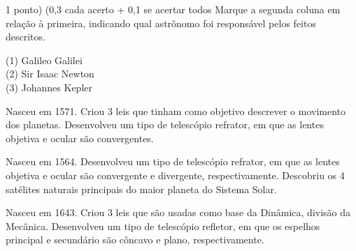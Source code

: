 \documentclass{../lista}
\begin{document}
	\begin{questao}{1 ponto) (0,3 cada acerto + 0,1 se acertar todos}
		Marque a segunda coluna em relação à primeira, indicando qual astrônomo foi responsável pelos feitos descritos.
		\begin{multicols}{2}
			\vfill\null \vfill\null
			\begin{flushleft}
				(1) Galileo Galilei \\
				(2) Sir Isaac Newton \\
				(3) Johannes Kepler
			\end{flushleft}
			\vfill\null \vfill\null
			\columnbreak
			\begin{alternativas}
				\item Nasceu em 1571. Criou 3 leis que tinham como objetivo descrever o movimento dos planetas. Desenvolveu um tipo de telescópio refrator, em que as lentes objetiva e ocular são convergentes.
				\item Nasceu em 1564. Desenvolveu um tipo de telescópio refrator, em que as lentes objetiva e ocular são convergente e divergente, respectivamente. Descobriu os 4 satélites naturais principais do maior planeta do Sistema Solar.
				\item Nasceu em 1643. Criou 3 leis que são usadas como base da Dinâmica, divisão da Mecânica. Desenvolveu um tipo de telescópio refletor, em que os espelhos principal e secundário são côncavo e plano, respectivamente.
			\end{alternativas}
		\end{multicols}
	\end{questao}
\end{document}
